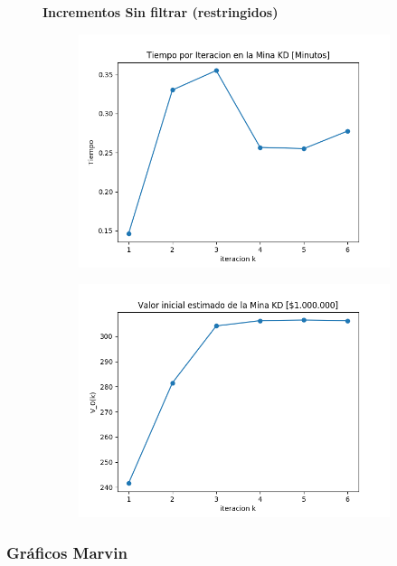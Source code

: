 \documentclass[12pt,letterpaper]{article}
\begin{document}
\begin{figure}[H]
  \textbf{Incrementos Sin filtrar (restringidos)}
  
  \begin{subfigure}[b]{0.4\textwidth}
     \includegraphics[width=\textwidth]{Graficos/sin_filtrar/restringido/kd_inc_times.png}
     \caption{}
     \label{fig:ex1}
  \end{subfigure}
  \begin{subfigure}[b]{0.4\textwidth}
     \includegraphics[width=\textwidth]{Graficos/Incrementos_filtrados/restringido/kd_inc_v_k.png}
     \caption{}
     \label{fig:ex2}
  \end{subfigure}
\end{figure}

\subsubsection{Gráficos Marvin}
\end{document}
